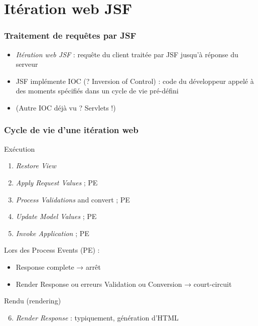 \documentclass[english, french]{beamer}
\begin{document}
\section[Itération web]{Itération web JSF}
\begin{frame}
	\frametitle{Traitement de requêtes par JSF}
	\begin{itemize}
		\item \emph{Itération web JSF} : requête du client {\tiny traitée par JSF} jusqu’à réponse du serveur
		\item JSF implémente IOC (? \pause Inversion of Control) \pause : code du développeur appelé à des moments spécifiés dans un cycle de vie pré-défini
		\item (Autre IOC déjà vu ? \pause Servlets !)
	\end{itemize}
\end{frame}

\begin{frame}
	\frametitle{Cycle de vie d’une itération web}
	\begin{minipage}[t]{6.8cm}\vspace{-2em}%
		\begin{block}{Exécution}
			\begin{enumerate}
				\item \emph{Restore View}
				\item \emph{Apply Request Values} ; PE
				\item \emph{Process Validations} {\tiny and convert} ; PE
				\item \emph{Update Model Values} ; PE
				\item \emph{Invoke Application} ; PE
			\end{enumerate}
		\end{block}
	\end{minipage}\hfill%
	\begin{minipage}[t]{\columnwidth - 4mm - 6.8cm}
		Lors des Process Events (PE) :
		\begin{itemize}
			\item Response complete → arrêt
			\item Render Response ou erreurs Validation ou Conversion → court-circuit
		\end{itemize}
	\end{minipage}
	\begin{block}{Rendu (rendering)}
		\begin{enumerate}\setcounter{enumi}{5}
			\item \emph{Render Response} : typiquement, génération d’HTML
		\end{enumerate}
	\end{block}
\end{frame}
\end{document}
